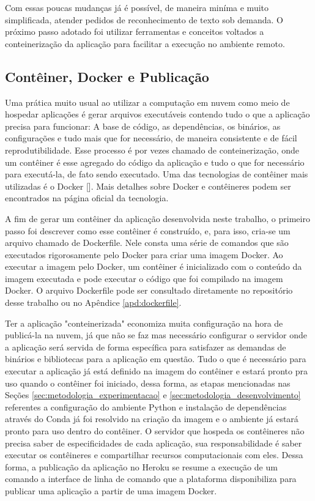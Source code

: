 Com essas poucas mudanças já é possível, de maneira miníma e muito simplificada, atender pedidos de reconhecimento de texto sob demanda. O próximo passo adotado foi utilizar ferramentas e conceitos voltados a conteinerização da aplicação para facilitar a execução no ambiente remoto.

\subsection{Contêiner, Docker e Publicação}
Uma prática muito usual ao utilizar a computação em nuvem como meio de hospedar aplicações é gerar arquivos executáveis contendo tudo o que a aplicação precisa para funcionar: A base de código, as dependências, os binários, as configurações e tudo mais que for necessário, de maneira consistente e de fácil reprodutibilidade. Esse processo é por vezes chamado de conteinerização, onde um contêiner é esse agregado do código da aplicação e tudo o que for necessário para executá-la, de fato sendo executado. Uma das tecnologias de contêiner mais utilizadas é o Docker []. Mais detalhes sobre Docker e contêineres podem ser encontrados na página oficial da tecnologia.

A fim de gerar um contêiner da aplicação desenvolvida neste trabalho, o primeiro passo foi descrever como esse contêiner é construído, e, para isso, cria-se um arquivo chamado de Dockerfile. Nele consta uma série de comandos que são executados rigorosamente pelo Docker para criar uma imagem Docker. Ao executar a imagem pelo Docker, um contêiner é inicializado com o conteúdo da imagem executada e pode executar o código que foi compilado na imagem Docker. O arquivo Dockerfile pode ser consultado diretamente no repositório desse trabalho ou no Apêndice \ref{apd:dockerfile}.

Ter a aplicação "conteinerizada" economiza muita configuração na hora de publicá-la na nuvem, já que não se faz mas necessário configurar o servidor onde a aplicação será servida de forma específica para satisfazer as demandas de binários e bibliotecas para a aplicação em questão. Tudo o que é necessário para executar a aplicação já está definido na imagem do contêiner e estará pronto pra uso quando o contêiner foi iniciado, dessa forma, as etapas mencionadas nas Seções \ref{sec:metodologia_experimentacao} e \ref{sec:metodologia_desenvolvimento} referentes a configuração do ambiente Python e instalação de dependências através do Conda já foi resolvido na criação da imagem e o ambiente já estará pronto para uso dentro do contêiner. O servidor que hospeda os contêineres não precisa saber de especificidades de cada aplicação, sua responsabilidade é saber executar os contêineres e compartilhar recursos computacionais com eles. Dessa forma, a publicação da aplicação no Heroku se resume a execução de um comando a interface de linha de comando que a plataforma disponibiliza para publicar uma aplicação a partir de uma imagem Docker.

